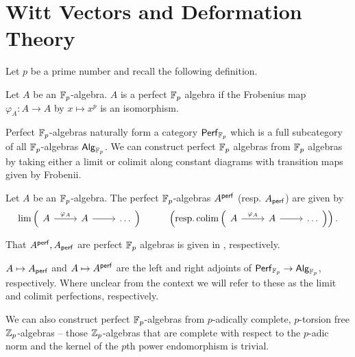 \section{Witt Vectors and Deformation Theory}\label{sec: Witt vectors}
Let $p$ be a prime number and recall the following definition. 
\begin{definition}\label{def: perfeft Fp algebra}
    Let $A$ be an $\mathbb{F}_{p}$-algebra. $A$ is a perfect $\mathbb{F}_{p}$ algebra if the Frobenius map $\varphi_{A}:A\to A$ by $x\mapsto x^{p}$ is an isomorphism. 
\end{definition}
Perfect $\mathbb{F}_{p}$-algebras naturally form a category $\mathsf{Perf}_{\mathbb{F}_{p}}$ which is a full subcategory of all $\mathbb{F}_{p}$-algebras $\mathsf{Alg}_{\mathbb{F}_{p}}$. We can construct perfect $\mathbb{F}_{p}$ algebras from $\mathbb{F}_{p}$ algebras by taking either a limit or colimit along constant diagrams with transition maps given by Frobenii. 
\begin{definition}[Perfection]\label{def: perfection}
    Let $A$ be an $\mathbb{F}_{p}$-algebra. The perfect $\mathbb{F}_{p}$-algebras $A^{\mathsf{perf}}$ (resp. $A_{\mathsf{perf}}$) are given by
    $$\lim\left(%
    \begin{tikzcd}
        A & A & \dots
        \arrow["{\varphi_{A}}", from=1-1, to=1-2]
        \arrow[from=1-2, to=1-3]
    \end{tikzcd}\right)\hspace{1cm}\left(\text{resp.}\colim\left(%
    \begin{tikzcd}
        A & A & \dots
        \arrow["{\varphi_{A}}", from=1-1, to=1-2]
        \arrow[from=1-2, to=1-3]
    \end{tikzcd}\right)\right).$$
\end{definition}
\begin{remark}
    That $A^{\mathsf{perf}},A_{\mathsf{perf}}$ are perfect $\mathbb{F}_{p}$ algebras is given in \cite[Prop. 1.4, Prop. 1.12]{Leptien}, respectively.
\end{remark}
\begin{remark}
    $A\mapsto A_{\mathsf{perf}}$ and $A\mapsto A^{\mathsf{perf}}$ are the left and right adjoints of $\mathsf{Perf}_{\mathbb{F}_{p}}\to\mathsf{Alg}_{\mathbb{F}_{p}}$, respectively. Where unclear from the context we will refer to these as the limit and colimit perfections, respectively. 
\end{remark}
We can also construct perfect $\mathbb{F}_{p}$-algebras from $p$-adically complete, $p$-torsion free $\mathbb{Z}_{p}$-algebras -- those $\mathbb{Z}_{p}$-algebras that are complete with respect to the $p$-adic norm and the kernel of the $p$th power endomorphism is trivial.
